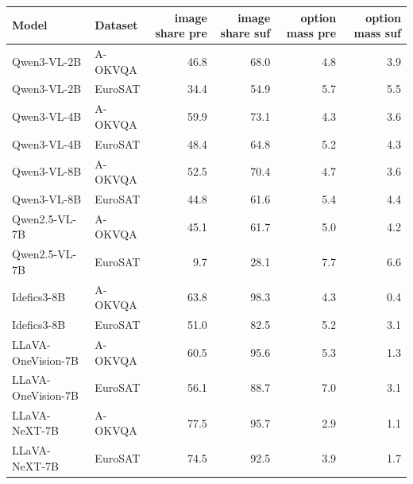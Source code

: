 \begin{tabular}{llrrrr}
\toprule
Model & Dataset & image share pre & image share suf & option mass pre & option mass suf \\
\midrule
Qwen3-VL-2B & A-OKVQA & 46.8 & 68.0 & 4.8 & 3.9 \\
Qwen3-VL-2B & EuroSAT & 34.4 & 54.9 & 5.7 & 5.5 \\
Qwen3-VL-4B & A-OKVQA & 59.9 & 73.1 & 4.3 & 3.6 \\
Qwen3-VL-4B & EuroSAT & 48.4 & 64.8 & 5.2 & 4.3 \\
Qwen3-VL-8B & A-OKVQA & 52.5 & 70.4 & 4.7 & 3.6 \\
Qwen3-VL-8B & EuroSAT & 44.8 & 61.6 & 5.4 & 4.4 \\
Qwen2.5-VL-7B & A-OKVQA & 45.1 & 61.7 & 5.0 & 4.2 \\
Qwen2.5-VL-7B & EuroSAT & 9.7 & 28.1 & 7.7 & 6.6 \\
Idefics3-8B & A-OKVQA & 63.8 & 98.3 & 4.3 & 0.4 \\
Idefics3-8B & EuroSAT & 51.0 & 82.5 & 5.2 & 3.1 \\
LLaVA-OneVision-7B & A-OKVQA & 60.5 & 95.6 & 5.3 & 1.3 \\
LLaVA-OneVision-7B & EuroSAT & 56.1 & 88.7 & 7.0 & 3.1 \\
LLaVA-NeXT-7B & A-OKVQA & 77.5 & 95.7 & 2.9 & 1.1 \\
LLaVA-NeXT-7B & EuroSAT & 74.5 & 92.5 & 3.9 & 1.7 \\
\bottomrule
\end{tabular}

